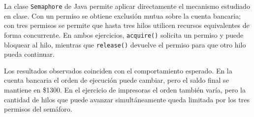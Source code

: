 \documentclass[12pt,oneside]{template/liverpoolthesis}
\begin{document}
La clase \texttt{Semaphore} de Java permite aplicar directamente el mecanismo
estudiado en clase. Con un permiso se obtiene exclusión mutua sobre la cuenta
bancaria; con tres permisos se permite que hasta tres hilos utilicen recursos
equivalentes de forma concurrente. En ambos ejercicios,
\texttt{acquire()} solicita un permiso y puede bloquear al hilo, mientras que
\texttt{release()} devuelve el permiso para que otro hilo pueda continuar.

Los resultados observados coinciden con el comportamiento esperado. En la
cuenta bancaria el orden de ejecución puede cambiar, pero el saldo final se
mantiene en \$1300. En el ejercicio de impresoras el orden también varía, pero
la cantidad de hilos que puede avanzar simultáneamente queda limitada por los
tres permisos del semáforo.
\end{document}
